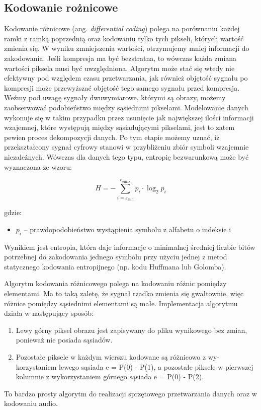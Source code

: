 \documentclass{article}
\begin{document}
\subsection{Kodowanie rożnicowe}

Kodowanie różnicowe (ang. \emph{differential coding}) polega na porównaniu każdej ramki z ramką
poprzednią oraz kodowaniu tylko tych pikseli, których wartość zmienia się. W wyniku
zmniejszenia wartości, otrzymujemy mniej informacji do zakodowania. Jeśli kompresja ma
być bezstratna, to wówczas każda zmiana wartości piksela musi być uwzględniona. Algorytm może stać się wtedy nie efektywny pod względem czasu przetwarzania, jak również objętość sygnału po kompresji może przewyższać objętość tego samego sygnału przed kompresja.  Weźmy pod uwagę sygnały dwuwymiarowe, którymi są obrazy, możemy zaobserwować podobieństwo między sąsiednimi pikselami. Modelowanie danych wykonuje się w takim przypadku przez usunięcie jak największej ilości informacji wzajemnej, które występują między sąsiadującymi pikselami, jest to zatem pewien proces dekompozycji danych. Po tym etapie możemy uznać, iż przekształcony sygnał cyfrowy stanowi w przybliżeniu zbiór symboli wzajemnie niezależnych. Wówczas dla danych tego typu, entropię bezwarunkową może być wyznaczona ze wzoru:

\begin{equation}
    H = -\sum_{i=\varepsilon_{\textrm{min}}}^{e_{\textrm{emax}}} p_{i} \cdot \log_{2} p_{i}
\end{equation}

gdzie:
\begin{itemize}[label=]
 \item $p_i$ -- prawdopodobieństwo wystąpienia symbolu z alfabetu o indeksie i
\end{itemize}

Wynikiem jest entropia, która daje informacje o minimalnej średniej liczbie bitów potrzebnej do zakodowania jednego symbolu przy użyciu jednej z metod statycznego kodowania entropijnego (np. kodu Huffmana lub Golomba).



Algorytm kodowania różnicowego polega na kodowaniu różnic pomiędzy elementami. Ma to taką zaletę, że sygnał rzadko zmienia się gwałtownie, więc różnice pomiędzy sąsiednimi elementami są małe. Implementacja algorytmu działa w następujący sposób:

\begin{enumerate}
 \item Lewy górny piksel obrazu jest zapisywany do pliku wynikowego bez zmian, ponieważ nie posiada sąsiadów.
 \item Pozostałe piksele w każdym wierszu kodowane są różnicowo z wy-korzystaniem lewego sąsiada e = P(0) - P(1), a pozostałe piksele w pierwszej kolumnie z wykorzystaniem górnego sąsiada e = P(0) - P(2).
\end{enumerate}
To bardzo prosty algorytm do realizacji sprzętowego przetwarzania danych oraz w kodowaniu audio.
\end{document}
